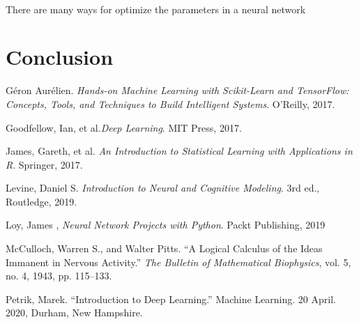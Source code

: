 \documentclass[12pt,letterpaper]{article}
\begin{document}
\paragraph*{}There are many ways for optimize the parameters in a neural network


\section*{Conclusion}



\begin{thebibliography}{9}


Géron Aurélien. \textit{Hands-on Machine Learning with Scikit-Learn and TensorFlow: Concepts, Tools, and Techniques to Build Intelligent Systems}. O'Reilly, 2017.

Goodfellow, Ian, et al.\textit{Deep Learning}. MIT Press, 2017.

James, Gareth, et al. \textit{An Introduction to Statistical Learning with Applications in R}. Springer, 2017.

Levine, Daniel S. \textit{Introduction to Neural and Cognitive Modeling}. 3rd ed., Routledge, 2019.

Loy, James , \textit{Neural Network Projects with Python}. Packt Publishing, 2019

McCulloch, Warren S., and Walter Pitts. “A Logical Calculus of the Ideas Immanent in Nervous Activity.” \textit{The Bulletin of Mathematical Biophysics}, vol. 5, no. 4, 1943, pp. 115–133.

Petrik, Marek. “Introduction to Deep Learning.” Machine Learning. 20 April. 2020, Durham, New Hampshire.

\end{thebibliography}

\end{document}
